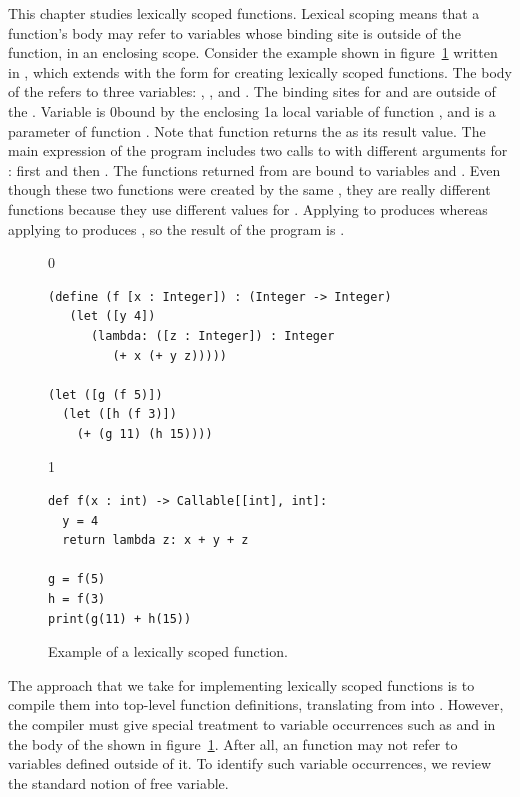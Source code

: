 \documentclass[7x10]{TimesAPriori_MIT}%
\def\racketEd{0}
\def\pythonEd{1}
\def\edition{1}
\newcommand{\racket}[1]{{\if\edition\racketEd{#1}\fi}}
\newcommand{\pythonColor}[0]{}
\newcommand{\python}[1]{{\if\edition\pythonEd\pythonColor #1\fi}}
\numberwithin{theorem}{chapter}
\numberwithin{definition}{chapter}
\numberwithin{equation}{chapter}
\begin{document}
This chapter studies lexically scoped functions. Lexical
scoping means that a function's body
may refer to variables whose binding site is outside of the function,
in an enclosing scope.
%
Consider the example shown in figure~\ref{fig:lexical-scoping} written
in \LangLam{}, which extends \LangFun{} with the
 form for creating lexically scoped
functions.  The body of the  refers to three variables:
, , and . The binding sites for  and
 are outside of the . Variable  is
\racket{bound by the enclosing }\python{a local variable of
  function }, and  is a parameter of function
. Note that function  returns the  as its
result value. The main expression of the program includes two calls to
 with different arguments for : first  and
then . The functions returned from  are bound to
variables  and . Even though these two functions were
created by the same , they are really different functions
because they use different values for . Applying  to
 produces  whereas applying  to 
produces , so the result of the program is .

\begin{figure}[btp]
\begin{tcolorbox}[colback=white]
{\if\edition\racketEd
\begin{lstlisting}
(define (f [x : Integer]) : (Integer -> Integer)
   (let ([y 4])
      (lambda: ([z : Integer]) : Integer
         (+ x (+ y z)))))

(let ([g (f 5)])
  (let ([h (f 3)])
    (+ (g 11) (h 15))))
\end{lstlisting}
\fi}
{\if\edition\pythonEd\pythonColor
\begin{lstlisting}
def f(x : int) -> Callable[[int], int]:
  y = 4
  return lambda z: x + y + z

g = f(5)
h = f(3)
print(g(11) + h(15))
\end{lstlisting}
\fi}
\end{tcolorbox}
\caption{Example of a lexically scoped function.}
\label{fig:lexical-scoping}
\end{figure}

The approach that we take for implementing lexically scoped functions
is to compile them into top-level function definitions, translating
from \LangLam{} into \LangFun{}.  However, the compiler must give
special treatment to variable occurrences such as  and
 in the body of the  shown in
figure~\ref{fig:lexical-scoping}. After all, an \LangFun{} function
may not refer to variables defined outside of it. To identify such
variable occurrences, we review the standard notion of free variable.
\end{document}

